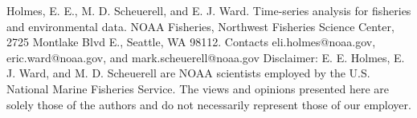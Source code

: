 

\thispagestyle{empty}
\vspace*{14cm}
\vfil
\begin{flushleft}

Holmes, E. E., M. D. Scheuerell, and E. J. Ward. Time-series analysis for fisheries and environmental data. NOAA Fisheries, Northwest Fisheries Science Center, 2725 Montlake Blvd E., Seattle, WA 98112.  Contacts eli.holmes@noaa.gov, eric.ward@noaa.gov, and mark.scheuerell@noaa.gov
\newline
\newline
Disclaimer: E. E. Holmes, E. J. Ward, and M. D. Scheuerell are NOAA scientists employed by the U.S. National Marine Fisheries Service.  The views and opinions presented here are solely those of the authors and do not necessarily represent those of our employer.

\end{flushleft}

